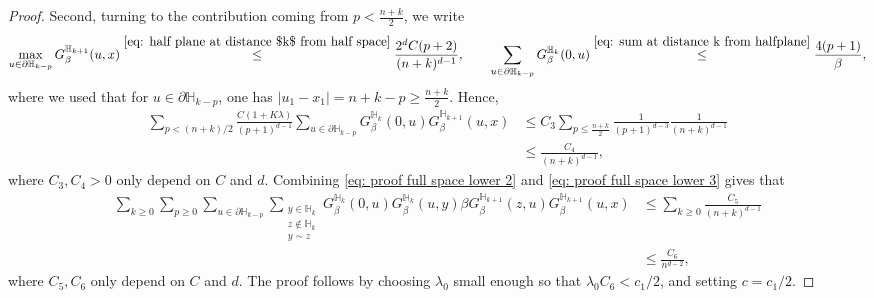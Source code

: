 \documentclass[11pt,a4paper]{article}
\numberwithin{equation}{section}
\theoremstyle{plain}
\theoremstyle{definition}
\begin{document}
\begin{proof}
Second, turning to the contribution coming from $p< \tfrac{n+k}{2}$, we write
\begin{equation}
	\max_{u\in \partial \mathbb H_{k-p}}G_\beta^{\mathbb H_{k+1}}(u,x)\stackrel{\eqref{eq: half plane at distance $k$ from half space}}\leq \frac{2^dC(p+2)}{(n+k)^{d-1}}, \qquad \sum_{u\in \partial \mathbb H_{k-p}}G_\beta^{\mathbb H_{k}}(0,u)\stackrel{\eqref{eq: sum at distance k from halfplane}}\leq \frac{4(p+1)}{\beta},
\end{equation}
where we used that for $u\in \partial \mathbb H_{k-p}$, one has $|u_1-x_1|=n+k-p\geq \tfrac{n+k}{2}$. Hence,
\begin{align}
	\sum_{p< (n+k)/2}\frac{C(1+K\lambda)}{(p+1)^{d-1}}\sum_{u\in \partial \mathbb H_{k-p}}G_\beta^{\mathbb H_k}(0,u)G_\beta^{\mathbb H_{k+1}}(u,x)&\leq C_3\sum_{p\leq\tfrac{n+k}{2}}\frac{1}{(p+1)^{d-3}}\frac{1}{(n+k)^{d-1}}
	\\&\leq \frac{C_4}{(n+k)^{d-1}},\label{eq: proof full space lower 3}
\end{align}
where $C_3,C_4>0$ only depend on $C$ and $d$. Combining \eqref{eq: proof full space lower 2} and \eqref{eq: proof full space lower 3} gives that
\begin{align}
	\sum_{k\geq 0}\sum_{p\geq 0}\sum_{u\in \partial \mathbb H_{k-p}}\sum_{\substack{y\in \mathbb H_k\\z\notin \mathbb H_k\\y\sim z}} G_\beta^{\mathbb H_k}(0,u)G_\beta^{\mathbb H_k}(u,y)\beta G_\beta^{\mathbb H_{k+1}}(z,u)G_\beta^{\mathbb H_{k+1}}(u,x)&\leq \sum_{k\geq 0}\frac{C_5}{(n+k)^{d-1}}\nonumber\\
	&\leq \frac{C_6}{n^{d-2}},
\end{align}
where $C_5,C_6$ only depend on $C$ and $d$. The proof follows by choosing $\lambda_0$ small enough so that $\lambda_0C_6<c_1/2$, and setting $c=c_1/2$.
%
%
\end{proof}
\end{document}
